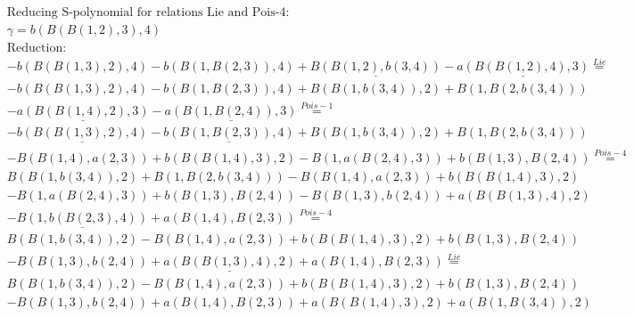 \documentclass[11pt]{amsart}
\begin{document}
\begin{align*} 
& \text{Reducing S-polynomial for relations Lie and Pois-4:} \\ 
& \gamma = b(B(B(1,2),3),4) \\ 
& \text{Reduction}: \\& - b(B(B(1,3),2),4) - b(B(1,B(2,3)),4) + \underline{B(B(1,2),b(3,4))} - \underline{a(B(B(1,2),4),3)} \stackrel{ Lie }{=}  \\ 
& - b(B(B(1,3),2),4) - b(B(1,B(2,3)),4) + B(B(1,b(3,4)),2) + B(1,B(2,b(3,4)))\\ 
 &  - \underline{a(B(B(1,4),2),3)} - \underline{a(B(1,B(2,4)),3)} \stackrel{ Pois-1 }{=}  \\ 
& - \underline{b(B(B(1,3),2),4)} - \underline{b(B(1,B(2,3)),4)} + B(B(1,b(3,4)),2) + B(1,B(2,b(3,4)))\\ 
 &  - B(B(1,4),a(2,3)) + b(B(B(1,4),3),2) - B(1,a(B(2,4),3)) + b(B(1,3),B(2,4)) \stackrel{ Pois-4 }{=}  \\ 
&B(B(1,b(3,4)),2) + B(1,B(2,b(3,4))) - B(B(1,4),a(2,3)) + b(B(B(1,4),3),2)\\ 
 &  - B(1,a(B(2,4),3)) + b(B(1,3),B(2,4)) - B(B(1,3),b(2,4)) + a(B(B(1,3),4),2)\\ 
 &  - \underline{B(1,b(B(2,3),4))} + a(B(1,4),B(2,3)) \stackrel{ Pois-4 }{=}  \\ 
&B(B(1,b(3,4)),2) - B(B(1,4),a(2,3)) + b(B(B(1,4),3),2) + b(B(1,3),B(2,4))\\ 
 &  - B(B(1,3),b(2,4)) + \underline{a(B(B(1,3),4),2)} + a(B(1,4),B(2,3)) \stackrel{ Lie }{=}  \\ 
&B(B(1,b(3,4)),2) - B(B(1,4),a(2,3)) + b(B(B(1,4),3),2) + b(B(1,3),B(2,4))\\ 
 &  - B(B(1,3),b(2,4)) + a(B(1,4),B(2,3)) + a(B(B(1,4),3),2) + a(B(1,B(3,4)),2)\\ 
\end{align*} 
 
\end{document}

